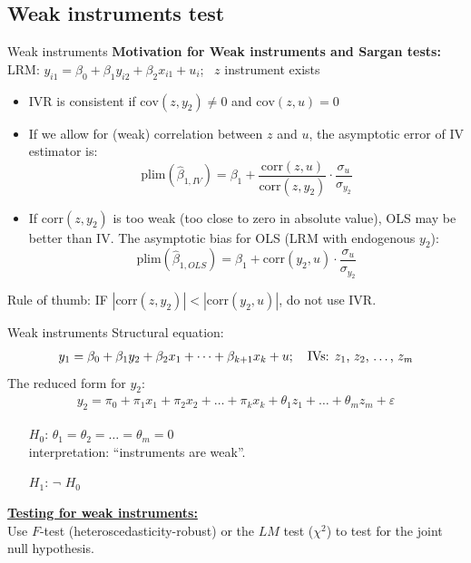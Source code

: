 \documentclass[usenames,dvipsnames]{beamer}
\begin{document}
\subsection{Weak instruments test}
\begin{frame}{Weak instruments}
\textbf{Motivation for Weak instruments and Sargan tests:} \\
\medskip
LRM: \quad $y_{i1}=\beta_0+\beta_1 y_{i2}+\beta_2 x_{i1}+u_i$; \ $z$ instrument exists
\bigskip
\begin{itemize}
\item IVR is consistent if $\mathrm{cov}(z,y_2) \neq 0$ and $\mathrm{cov}(z, u) = 0$
\item If we allow for (weak) correlation between $z$ and $u$, the asymptotic error of IV estimator is:
\small $$\mathrm{plim}(\hat{\beta}_{1, IV}) = \beta_1 + \frac{\mathrm{corr}(z,u)}{\mathrm{corr}(z,y_2)} \cdot \frac{\sigma_u}{\sigma_{y_2}} $$
\item If $\mathrm{corr}(z, y_2)$ is too weak (too close to zero in absolute value), OLS may be better than IV. The asymptotic bias for OLS (LRM with endogenous $y_2$):
\small $$\mathrm{plim}(\hat{\beta}_{1,OLS})=\beta_1+\mathrm{corr}(y_2,u) \cdot \frac{\sigma_u}{\sigma_{y_2}}$$
\end{itemize}
Rule of thumb: IF $|\mathrm{corr}(z,y_2)| < |\mathrm{corr}(y_2,u)|$, do not use IVR.
\end{frame}
\begin{frame}{Weak instruments}
Structural equation: 
\begin{align*}
y_1=\beta_0+\beta_1 y_2 + \beta_2 x_1 + \dots + \beta_{k+1} x_k + u; \quad \text{IVs: $z_1$, $z_2$, \dots , $z_m$}
\end{align*}
The reduced form for $y_2$: 
\begin{align*}
y_2=\pi_0 + \pi_1 x_1 + \pi_2 x_2 + \dots + \pi_k x_k + \theta_1 z_1 + \dots + \theta_m z_m + \varepsilon
\end{align*}
\vspace{-0.3cm}
\begin{itemize}
\item[$H_0$:] $\theta_1=\theta_2=\dots=\theta_m=0$ \\interpretation: ``instruments are weak''.
\item[$H_1$:] $\neg$ $H_0$
\end{itemize}
\bigskip
\textbf{\underline{Testing for weak instruments:}} \\
\medskip
Use $F$-test (heteroscedasticity-robust) or the $LM$ test ($\chi^2$) to test for the joint null hypothesis.
\end{frame}
\end{document}
